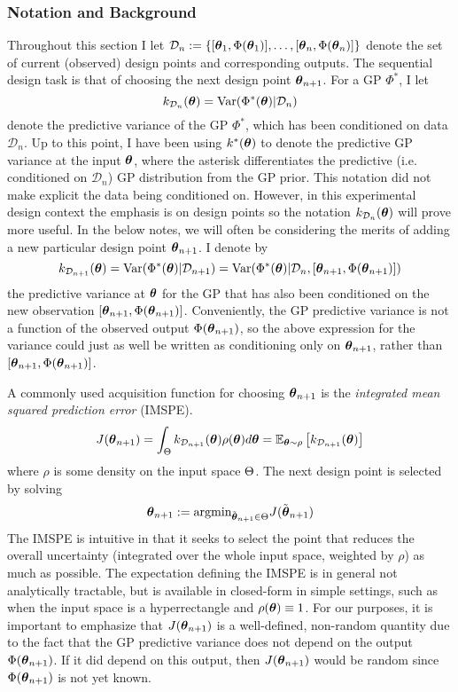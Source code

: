 \documentclass[12pt]{article}
\begin{document}
\subsubsection{Notation and Background}
Throughout this section I let $\mathcal{D}_n := \{[\boldsymbol{\theta}_1, \Phi(\boldsymbol{\theta}_1)], \dots, [\boldsymbol{\theta}_n, \Phi(\boldsymbol{\theta}_n)]\}$ denote the set of current (observed) design points and corresponding outputs. 
The sequential design task is that of choosing the 
next design point $\boldsymbol{\theta}_{n+1}$. For a GP $\Phi^*$, I let
\[k_{\mathcal{D}_{n}}(\boldsymbol{\theta}) = \mathrm{Var}(\Phi^*(\boldsymbol{\theta})|\mathcal{D}_{n})\]
denote the predictive variance of the GP $\Phi^*$, which has been conditioned on data $\mathcal{D}_n$. Up to this point, I have been using $k^*(\boldsymbol{\theta})$ to denote the predictive GP variance 
at the input $\boldsymbol{\theta}$, where the asterisk differentiates the predictive (i.e. conditioned on $\mathcal{D}_n$) GP distribution from the GP prior. This notation did not make explicit the data being 
conditioned on. However, in this experimental design context the emphasis is on design points so the notation $k_{\mathcal{D}_{n}}(\boldsymbol{\theta})$ will prove more useful. 
In the below notes, we will often be considering the merits of adding a new particular design point $\boldsymbol{\theta}_{n + 1}$. I denote by 
\[k_{\mathcal{D}_{n+1}}(\boldsymbol{\theta}) = \mathrm{Var}(\Phi^*(\boldsymbol{\theta})|\mathcal{D}_{n+1}) = \mathrm{Var}(\Phi^*(\boldsymbol{\theta})|\mathcal{D}_{n}, [\boldsymbol{\theta}_{n+1}, \Phi(\boldsymbol{\theta}_{n+1})])\]
the predictive variance at $\boldsymbol{\theta}$ for the GP that has also been conditioned on the new observation $[\boldsymbol{\theta}_{n+1}, \Phi(\boldsymbol{\theta}_{n+1})]$. Conveniently, the GP predictive 
variance is not a function of the observed output $\Phi(\boldsymbol{\theta}_{n+1})$, so the above expression for the variance could just as well be written as conditioning only on 
$\boldsymbol{\theta}_{n+1}$, rather than $[\boldsymbol{\theta}_{n+1}, \Phi(\boldsymbol{\theta}_{n+1})]$. 

A commonly used acquisition function for choosing $\boldsymbol{\theta}_{n+1}$ is the \textit{integrated mean squared prediction error} (IMSPE). 
\begin{align*}
J(\boldsymbol{\theta}_{n+1}) = \int_{\Theta} k_{\mathcal{D}_{n+1}}(\boldsymbol{\theta}) \rho(\boldsymbol{\theta}) d\boldsymbol{\theta} = \mathbb{E}_{\boldsymbol{\theta} \sim \rho} \left[k_{\mathcal{D}_{n+1}}(\boldsymbol{\theta}) \right]
\end{align*}
where $\rho$ is some density on the input space $\Theta$. The next design point is selected by solving 
\[\boldsymbol{\theta}_{n + 1} := \text{argmin}_{\tilde{\boldsymbol{\theta}}_{n+1} \in \Theta} J(\tilde{\boldsymbol{\theta}}_{n+1}) \]
The IMSPE is intuitive in that it seeks to select the point that reduces the overall uncertainty (integrated over the whole input space, weighted by $\rho$) as much as possible. 
The expectation defining the IMSPE is in general not analytically tractable, but is available in closed-form in simple settings, such as when the input space is a 
hyperrectangle and $\rho(\boldsymbol{\theta}) \equiv 1$. For our purposes, it is important to emphasize that $J(\boldsymbol{\theta}_{n+1})$ is a well-defined, non-random quantity due to the fact 
that the GP predictive variance does not depend on the output $\Phi(\boldsymbol{\theta}_{n+1})$. If it did depend on this output, then $J(\boldsymbol{\theta}_{n+1})$ would be random since 
$\Phi(\boldsymbol{\theta}_{n+1})$ is not yet known. 
\end{document}
